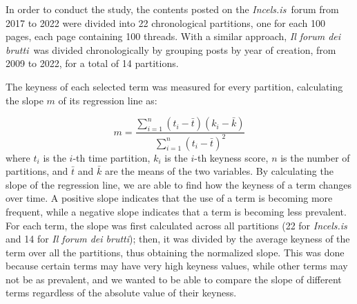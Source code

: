 \documentclass[11pt]{article}
\newcommand{\enforum}{\textit{Incels.is}}
\newcommand{\itforum}{\textit{Il forum dei brutti}}
\begin{document}

In order to conduct the study, the contents posted on the \enforum\, forum from 2017 to 2022 were divided into 22 chronological partitions, one for each 100 pages, each page containing 100 threads. With a similar approach, \itforum\, was divided chronologically by grouping posts by year of creation, from 2009 to 2022, for a total of 14 partitions. 

The keyness of each selected term was measured for every partition, calculating the slope $m$ of its regression line as:


\begin{equation}
  \label{eq:slope}
  m = \frac{\sum_{i=1}^{n} (t_i - \bar{t})(k_i - \bar{k})}{\sum_{i=1}^{n} (t_i - \bar{t})^2}
\end{equation}
where $t_i$ is the $i$-th time partition, $k_i$ is the $i$-th keyness score, $n$ is the number of partitions, and $\bar{t}$ and $\bar{k}$ are the means of the two variables. By calculating the slope of the regression line, we are able to find how the keyness of a term changes over time. A positive slope indicates that the use of a term is becoming more frequent, while a negative slope indicates that a term is becoming less prevalent. For each term, the slope was first calculated across all partitions (22 for \enforum\, and 14 for \itforum); then, it was divided by the average keyness of the term over all the partitions, thus obtaining the normalized slope. This was done because certain terms may have very high keyness values, while other terms may not be as prevalent, and we wanted to be able to compare the slope of different terms regardless of the absolute value of their keyness.
\end{document}
